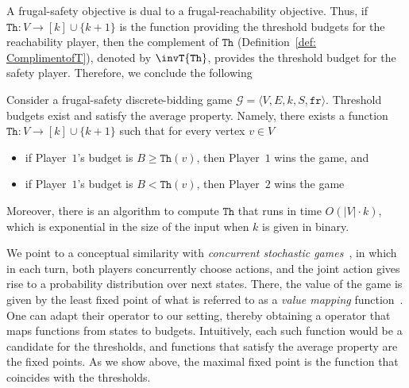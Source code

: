 \documentclass{theoretics}
\newcommand{\PO}{Player~$1$\xspace}
\newcommand{\PT}{Player~$2$\xspace}
\newcommand{\G}{{\mathcal G}}
\newcommand{\fr}{\texttt{fr}}
\newcommand{\thresh}{\texttt{Th}\xspace}
\newcommand{\zug}[1]{\langle #1  \rangle}
\newcommand{\stam}[1]{}
\begin{document}
A frugal-safety objective is dual to a frugal-reachability objective. 
 Thus, if \(\thresh: V \rightarrow [k] \cup \{k+1\}\) is the function providing the threshold budgets for the reachability player, then the complement of \(\thresh\) (Definition~\ref{def: ComplimentofT}), denoted by \(\invT{\thresh}\), provides the threshold budget for the safety player. 
 Therefore, we conclude the following 
  
\begin{corollary}\label{corr: frugalSafety}
	Consider a frugal-safety discrete-bidding game \(\G = \zug{V, E, k, S, \fr}\). Threshold budgets exist and satisfy the average property. 
	Namely, there exists a function \(\thresh: V \rightarrow [k] \cup \{k+1\}\) such that for every vertex $v \in V$ 
	\begin{itemize}
		\item if \PO's budget is $B \geq \thresh(v)$, then \PO wins the game, and
		\item if \PO's budget is $B < \thresh(v)$, then \PT wins the game
	\end{itemize}
	Moreover, there is an algorithm to compute $\thresh$ that runs in time $O(|V| \cdot k)$, which is exponential in the size of the input when $k$ is given in binary.
\end{corollary}


\begin{remark}
We point to a conceptual similarity with {\em concurrent stochastic games}~\cite{Everett57}, in which in each turn, both players concurrently choose actions, and the joint action gives rise to a probability distribution over next states. There, the value of the game is given by the least fixed point of what is referred to as a \emph{value mapping} function~\cite{Everett57,FV12}. 
One can adapt their operator to our setting, thereby obtaining a operator that maps functions from states to budgets. Intuitively, each such function would be a candidate for the thresholds, and functions that satisfy the average property are the fixed points. As we show above, the maximal fixed point is the function that coincides with the thresholds. 
\stam{%
On the other hand, structurally there is a similarity in between our algorithm for computing the threshold budgets and how values of a concurrent stochastic reachability games are computed~\cite{Everett57, FV12}. 
There, the values are given by the least fixed point of what is referred to as a \emph{value mapping} function~\cite{Everett57}. 
In our case this value mapping function maps one candidate for a function computing threshold budgets to another candidate of the same.
}
\end{remark}
\end{document}

